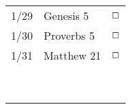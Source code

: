 \documentclass[10pt,landscape,letterpaper]{article}
\begin{document}
\begin{multicols}{5}
\begin{tabular}{p{0.3in}p{0.75in}p{0.4in}}
1/29 & \textcolor[rgb]{0.98,0.00,0.00}{Genesis 5} & \textcolor[rgb]{0.98,0.00,0.00}{$\boxempty$} \\
1/30 & \textcolor[rgb]{0.98,0.00,0.00}{Proverbs 5} & \textcolor[rgb]{0.98,0.00,0.00}{$\boxempty$} \\
1/31 & Matthew 21 & $\boxempty$ \\
 &  &  \\
 &  &  \\
 &  &  \\
 &  &  \\
 &  &  \\
 &  &  \\
 &  &  \\
 &  &  \\
 &  &  \\

\end{tabular}



\end{multicols}
\end{document}
